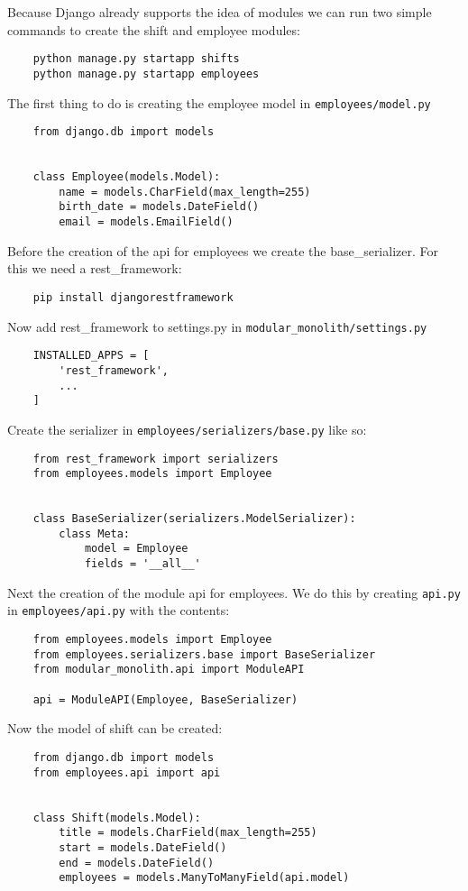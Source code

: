 Because Django already supports the idea of modules we can run two simple commands to create the shift and employee modules:
\begin{verbatim}
    python manage.py startapp shifts
    python manage.py startapp employees
\end{verbatim}

The first thing to do is creating the employee model in \texttt{employees/model.py}
\begin{verbatim}
    from django.db import models


    class Employee(models.Model):
        name = models.CharField(max_length=255)
        birth_date = models.DateField()
        email = models.EmailField()
\end{verbatim}

Before the creation of the api for employees we create the base\_serializer. For this we need a rest\_framework:
\begin{verbatim}
    pip install djangorestframework
\end{verbatim}

Now add rest\_framework to settings.py in \texttt{modular\_monolith/settings.py}
\begin{verbatim}
    INSTALLED_APPS = [
        'rest_framework',
        ...
    ]
\end{verbatim}

Create the serializer in \texttt{employees/serializers/base.py} like so:
\begin{verbatim}
    from rest_framework import serializers
    from employees.models import Employee


    class BaseSerializer(serializers.ModelSerializer):
        class Meta:
            model = Employee
            fields = '__all__'
\end{verbatim}

Next the creation of the module api for employees. We do this by creating \texttt{api.py} in \texttt{employees/api.py} with the contents:
\begin{verbatim}
    from employees.models import Employee
    from employees.serializers.base import BaseSerializer
    from modular_monolith.api import ModuleAPI

    api = ModuleAPI(Employee, BaseSerializer)
\end{verbatim}

Now the model of shift can be created:
\begin{verbatim}
    from django.db import models
    from employees.api import api


    class Shift(models.Model):
        title = models.CharField(max_length=255)
        start = models.DateField()
        end = models.DateField()
        employees = models.ManyToManyField(api.model)
\end{verbatim}

